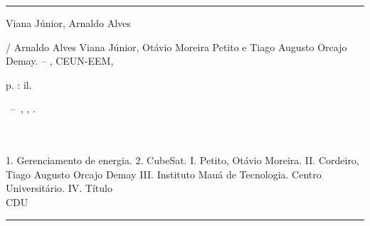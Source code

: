 \documentclass[
	12pt,				%
	openright,			%
	oneside,			%
	a4paper,			%
	english,			%
	french,				%
	spanish,			%
	brazil,				%
	oldfontcommands
	]{abntex2}
\begin{document}
\frenchspacing 

\imprimircapa

\imprimirfolhaderosto*


%
%     
\begin{fichacatalografica}
	\vspace*{\fill}					%
	\hrule							%
	\begin{center}					%
	\begin{minipage}[c]{12.5cm}		%
	
	Viana Júnior, Arnaldo Alves
	
	\hspace{0.5cm} \imprimirtitulo/ Arnaldo Alves Viana Júnior, Otávio Moreira Petito e Tiago Augusto Orcajo Demay. --
	\imprimirlocal, CEUN-EEM, \imprimirdata
	
	\hspace{0.5cm} \pageref{LastPage} p. : il. \\
	
	\hspace{0.5cm}
	\parbox[t]{\textwidth}{\imprimirtipotrabalho~--~\imprimirinstituicao,
	\imprimirlocal, \imprimirdata.}\\
	
	\hspace{0.5cm} \imprimirorientadorRotulo~\imprimirorientador\\
	
	\hspace{0.5cm}
		1. Gerenciamento de energia.
		2. CubeSat.
		I. Petito, Otávio Moreira.
		II. Cordeiro, Tiago Augusto Orcajo Demay
		III. Instituto Mauá de Tecnologia. Centro Universitário.
		IV. Título\\ 			
	
	\hspace{8.75cm} CDU \\
	
	\end{minipage}
	\end{center}
	\hrule
\end{fichacatalografica}
\end{document}

